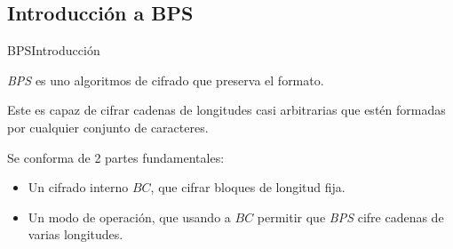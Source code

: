 %
%

\subsection{Introducción a BPS}

\begin{frame}{BPS}{Introducción}

  \textit{BPS} es uno algoritmos de cifrado que preserva el formato.
  
  Este es capaz de cifrar cadenas de longitudes casi arbitrarias que estén 
  formadas por cualquier conjunto de caracteres.
  
  Se conforma de 2 partes fundamentales:

  \begin{itemize}
    \item Un cifrado interno $BC$, que cifrar bloques de longitud fija.
    \item Un modo de operación, que usando a $BC$ permitir que \textit{BPS} 
    cifre cadenas de varias longitudes.
  \end{itemize}
  
\end{frame}

